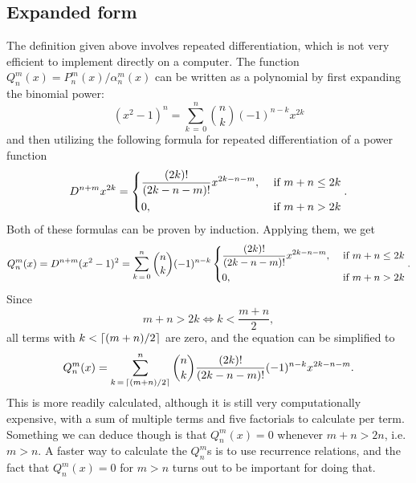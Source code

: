 \documentclass[12pt]{article}
\begin{document}
\subsection{Expanded form}
The definition given above involves repeated differentiation, which is not very efficient to implement directly on a computer. The function $Q_n^m(x)=P_n^m(x)/\alpha_n^m(x)$ can be written as a polynomial by first expanding the binomial power:
\begin{equation}
  (x^2 - 1)^n = \displaystyle\sum_{k\,=\,0}^{n}{n\choose k}(-1)^{n-k}x^{2k}
\end{equation}
and then utilizing the following formula for repeated differentiation of a power function
\begin{equation}
  D^{n+m}x^{2k} = \begin{dcases}
    \frac{(2k)!}{(2k-n-m)!}x^{2k-n-m}, &\text{ if }m + n \leq 2k\\
    0, &\text{ if }m + n > 2k
  \end{dcases}.
\end{equation}
Both of these formulas can be proven by induction. Applying them, we get 
\begin{equation}
  Q_n^m(x) = D^{n+m}(x^2 - 1)^2 = \sum_{k\,=\,0}^{n}{n\choose k}(-1)^{n-k}\begin{dcases}
    \frac{(2k)!}{(2k-n-m)!}x^{2k-n-m}, &\text{ if }m + n \leq 2k\\
    0, &\text{ if }m + n > 2k
  \end{dcases}.
\end{equation}
Since
\begin{equation}
  m + n > 2k \Longleftrightarrow k < \frac{m+n}{2},
\end{equation}
all terms with $k<\lceil(m+n)/2\rceil$ are zero, and the equation can be simplified to
\begin{equation}
  Q_n^m(x) = \sum_{k\,=\,\lceil(m+n)/2\rceil}^{n}{n\choose k}\frac{(2k)!}{(2k-n-m)!}(-1)^{n-k}x^{2k-n-m}.
\end{equation}
This is more readily calculated, although it is still very computationally expensive, with a sum of multiple terms and five factorials to calculate per term. Something we can deduce though is that $Q_n^m(x)=0$ whenever $m+n>2n$, i.e. $m > n$. A faster way to calculate the $Q_n^m$s is to use recurrence relations, and the fact that $Q_n^m(x)=0$ for $m>n$ turns out to be important for doing that.
\end{document}
